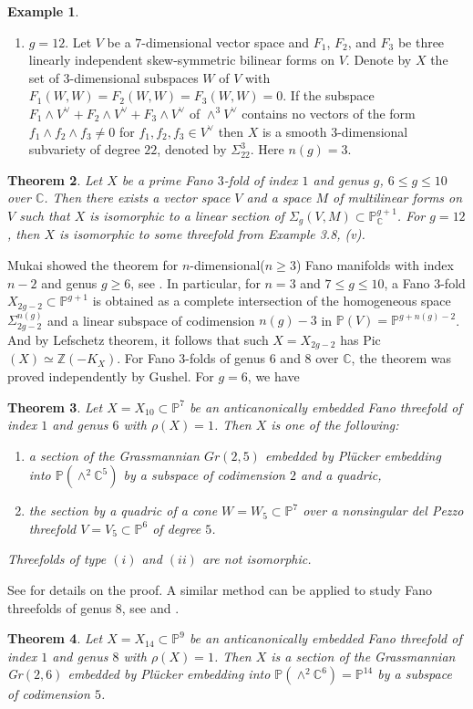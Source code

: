 \documentclass[11pt]{amsart}
\theoremstyle{plain}
\newtheorem{theorem}{Theorem}[section]
\theoremstyle{definition}
\newtheorem{example}[theorem]{Example}
\theoremstyle{expl}
\begin{document}
\begin{example}
\begin{enumerate}
            \item[(v)] $g=12$. Let $V$ be a $7$-dimensional vector space and $F_1$, $F_2$, and $F_3$ be three linearly independent skew-symmetric bilinear forms on $V$. Denote by $X$ the set of $3$-dimensional subspaces $W$ of $V$ with $F_1(W,W)=F_2(W,W)=F_3(W,W)=0$. If the subspace $F_1 \wedge V^{\vee} + F_2 \wedge V^{\vee} + F_3 \wedge V^{\vee}$ of $\wedge^3 V^{\vee}$ contains no vectors of the form $f_1 \wedge f_2 \wedge f_3 \neq 0$ for $f_1, f_2, f_3 \in V^{\vee}$ then $X$ is a smooth $3$-dimensional subvariety of degree $22$, denoted by $\Sigma_{22}^3$. Here $n(g)= 3$.
        \end{enumerate}
\end{example}
\begin{theorem}
    Let $X$ be a prime Fano $3$-fold of index $1$ and genus $g$, $6\leq g \leq 10$ over $\mathbb{C}$. Then there exists a vector space $V$ and a space $M$ of multilinear forms on $V$ such that $X$ is isomorphic to a linear section of $\Sigma_g(V,M) \subset \mathbb{P}^{g+1}_{\mathbb{C}}$.
    For $g=12$, then $X$ is isomorphic to some threefold from Example 3.8, (v).
\end{theorem}
Mukai showed the theorem for $n$-dimensional($n\geq 3$) Fano manifolds with index $n-2$ and genus $g\geq 6$, see \cite{Muk89}.
In particular, for $n=3$ and $7 \leq g \leq 10$, a Fano $3$-fold $X_{2g-2} \subset \mathbb{P}^{g+1}$ is obtained as a complete intersection of the homogeneous space $\Sigma_{2g-2}^{n(g)}$ and a linear subspace of codimension $n(g)-3$ in $\mathbb{P}(V) = \mathbb{P}^{g+n(g)-2}$. And by Lefschetz theorem, it follows that such $X=X_{2g-2}$ has Pic $(X) \simeq \mathbb{Z}(-K_X)$.
For Fano $3$-folds of genus $6$ and $8$ over $\mathbb{C}$, the theorem was proved independently by Gushel. For $g=6$, we have  
\begin{theorem}
    Let $X=X_{10} \subset \mathbb{P}^7$ be an anticanonically embedded Fano threefold of index $1$ and genus $6$ with $\rho(X)=1$. Then $X$ is one of the following:
    \begin{enumerate}
        \item[(i)] a section of the Grassmannian $Gr(2,5)$ embedded by Pl\"{u}cker embedding into $\mathbb{P}(\wedge^2 \mathbb{C}^5)$ by a subspace of codimension $2$ and a quadric,
        \item[(ii)] the section by a quadric of a cone $W=W_5 \subset\mathbb{P}^7$ over a nonsingular del Pezzo threefold $V= V_5 \subset \mathbb{P}^6$ of degree $5$.
    \end{enumerate}
    Threefolds of type $(i)$ and $(ii)$ are not isomorphic.
\end{theorem}
See \cite{Gus6} for details on the proof.
A similar method can be applied to study Fano threefolds of genus $8$, see \cite{Gus83} and \cite{Gus92}. 
\begin{theorem}
    Let $X=X_{14} \subset \mathbb{P}^9$ be an anticanonically embedded Fano threefold of index $1$ and genus $8$ with $\rho(X)=1$. Then $X$ is a section of the Grassmannian Gr$(2,6)$ embedded by Pl\"{u}cker embedding into $\mathbb{P}(\wedge^2 \mathbb{C}^6) = \mathbb{P}^{14}$ by a subspace of codimension $5$.
\end{theorem}
\end{document}
